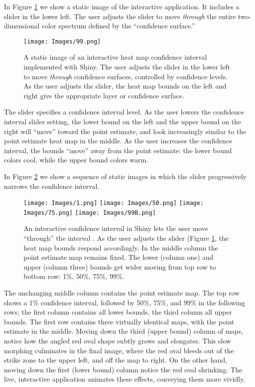 In Figure \ref{fig:Shiny} we show a static image of the interactive application. It includes a slider in the lower left. The user adjusts the slider to move {\it through} the entire two-dimensional color spectrum defined by the ``confidence surface.''
  \begin{figure}[H]
	\centering
	\texttt{[image: Images/99.png]}
	\caption{A static image of an interactive heat map confidence interval implemented with Shiny. The user adjusts the slider in the lower left to move {\it through} confidence surfaces, controlled by confidence levels. As the user adjusts the slider, the heat map bounds on the left and right give the appropriate layer or confidence surface.}
	\label{fig:Shiny}
	\end{figure}
The slider specifies a confidence interval level. As the user lowers the confidence interval slider setting, the lower bound on the left and the upper bound on the right will ``move'' toward the point estimate, and look increasingly similar to the point estimate heat map in the middle. As the user increases the confidence interval, the bounds ``move'' away from the point estimate: the lower bound colors cool, while the upper bound colors warm.

In Figure \ref{fig:sequence} we show a sequence of static images in which the slider progressively narrows the confidence interval.
  \begin{figure}[H]
	\centering
	\texttt{[image: Images/1.png]}
	\texttt{[image: Images/50.png]}
	\texttt{[image: Images/75.png]}
	\texttt{[image: Images/99B.png]}
	\caption{An interactive confidence interval in Shiny lets the user move ``through'' the interval \citep{Shiny}. As the user adjusts the slider (Figure \ref{fig:Shiny}, the heat map bounds respond accordingly. In the middle column the point estimate map remains fixed. The lower (column one) and upper (column three) bounds get wider moving from top row to bottom row: 1\%, 50\%, 75\%, 99\%.}
	\label{fig:sequence}
	\end{figure}
The unchanging middle column contains the point estimate map. The top row shows a 1\% confidence interval, followed by 50\%, 75\%, and 99\% in the following rows; the first column contains all lower bounds, the third column all upper bounds. The first row contains three virtually identical maps, with the point estimate in the middle. Moving down the third (upper bound) column of maps, notice how the angled red oval shape subtly grows and elongates. This slow morphing culminates in the final image, where the red oval bleeds out of the strike zone to the upper left, and off the map to right. On the other hand, moving down the first (lower bound) column notice the red oval shrinking. The live, interactive application animates these effects, conveying them more vividly.

